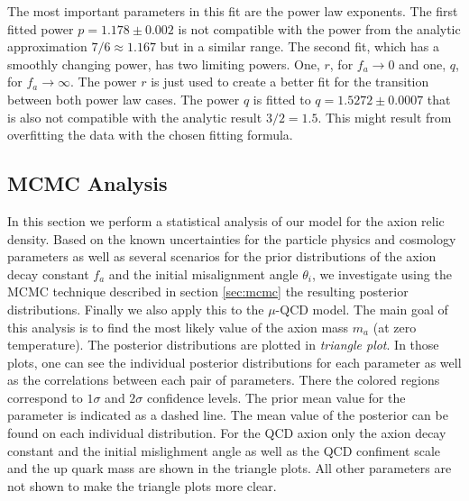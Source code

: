 \documentclass[twoside,a4paper, 12pt]{article}
\numberwithin{equation}{section}
\begin{document}
The most important parameters in this fit are the power law exponents.
The first fitted power $p = 1.178 \pm 0.002$ is not compatible with the power from the analytic
approximation $7/6 \approx 1.167$ but in a similar range. 
The second fit, which has a smoothly changing power, has two limiting powers.
One, $r$, for $f_a \rightarrow 0$ and one, $q$, for $f_a \rightarrow \infty$.
The power $r$ is just used to create a better fit for the transition between both power law cases.
The power $q$ is fitted to $q = 1.5272 \pm 0.0007$ that is also not
compatible with the analytic result $3 / 2 = 1.5$.
This might result from overfitting the data with the chosen fitting formula.

\subsection{MCMC Analysis}
\label{sec:mcmc_analysis}
In this section we perform a statistical analysis of our model for the axion relic density.
Based on the known uncertainties for the particle physics and cosmology parameters as well as
several scenarios for the prior distributions of the axion decay constant $f_a$ and
the initial misalignment angle $\theta_i$, we investigate using 
the MCMC technique described in section \ref{sec:mcmc} 
the resulting posterior distributions.
Finally we also apply this to the $\mu$-QCD model.
The main goal of this analysis is to find the most likely value of the
axion mass $m_a$ (at zero temperature).
The posterior distributions are plotted in \emph{triangle plot}.
In those plots, one can see the individual posterior distributions for each parameter as well as
the correlations between each pair of parameters. There the colored regions correspond to $1\sigma$ 
and $2 \sigma$ confidence levels. The prior mean value for the parameter is indicated as a dashed
line. The mean value of the posterior can be found on each individual distribution.
For the QCD axion only the axion decay constant and the initial mislighment angle as well as
the QCD confiment scale and the up quark mass are shown in the triangle plots.
All other parameters are not shown to make the triangle plots more clear.
\end{document}
